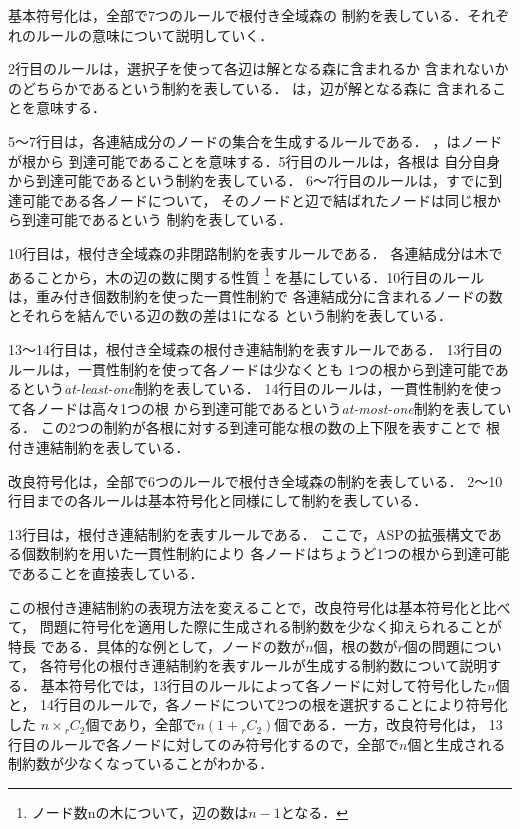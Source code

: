 基本符号化は，全部で7つのルールで根付き全域森の
制約を表している．それぞれのルールの意味について説明していく．

2行目のルールは，選択子を使って各辺は解となる森に含まれるか
含まれないかのどちらかであるという制約を表している．
は，辺が解となる森に
含まれることを意味する．

5～7行目は，各連結成分のノードの集合を生成するルールである．
，はノードが根から
到達可能であることを意味する．5行目のルールは，各根は
自分自身から到達可能であるという制約を表している．
6～7行目のルールは，すでに到達可能である各ノードについて，
そのノードと辺で結ばれたノードは同じ根から到達可能であるという
制約を表している．

10行目は，根付き全域森の非閉路制約を表すルールである．
各連結成分は木であることから，木の辺の数に関する性質
\footnote{ノード数nの木について，辺の数は$n - 1$となる．}
を基にしている．10行目のルールは，重み付き個数制約を使った一貫性制約で
各連結成分に含まれるノードの数とそれらを結んでいる辺の数の差は1になる
という制約を表している．

13～14行目は，根付き全域森の根付き連結制約を表すルールである．
13行目のルールは，一貫性制約を使って各ノードは少なくとも
1つの根から到達可能であるという\textit{at-least-one}制約を表している．
14行目のルールは，一貫性制約を使って各ノードは高々1つの根
から到達可能であるという\textit{at-most-one}制約を表している．
この2つの制約が各根に対する到達可能な根の数の上下限を表すことで
根付き連結制約を表している．

改良符号化は，全部で6つのルールで根付き全域森の制約を表している．
2～10行目までの各ルールは基本符号化と同様にして制約を表している．

13行目は，根付き連結制約を表すルールである．
ここで，ASPの拡張構文である個数制約を用いた一貫性制約により
各ノードはちょうど1つの根から到達可能であることを直接表している．

この根付き連結制約の表現方法を変えることで，改良符号化は基本符号化と比べて，
問題に符号化を適用した際に生成される制約数を少なく抑えられることが特長
である．具体的な例として，ノードの数が$n$個，根の数が$r$個の問題について，
各符号化の根付き連結制約を表すルールが生成する制約数について説明する．
基本符号化では，13行目のルールによって各ノードに対して符号化した$n$個と，
14行目のルールで，各ノードについて2つの根を選択することにより符号化した
$n\times{}_rC_2$個であり，全部で$n(1+{}_rC_2)$個である．一方，改良符号化は，
13行目のルールで各ノードに対してのみ符号化するので，全部で$n$個と生成される
制約数が少なくなっていることがわかる．